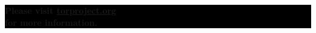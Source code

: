 \documentclass[10.5pt,a4paper]{article} %
\begin{document}
\begin{multicols*}{2}
\begin{center}
	\vfill %
	\colorbox{Black}{
		\begin{minipage}{8cm}
			\color{white}
			\vspace{0.2cm}
			\begin{center}
				\textbf{{\Large Please visit \url{torproject.org}\\for more information.}}
			\end{center}
			\vspace{0.2cm}
		\end{minipage}
	}
\end{center}

\vspace{0.75cm}

\end{multicols*}
\end{document}
